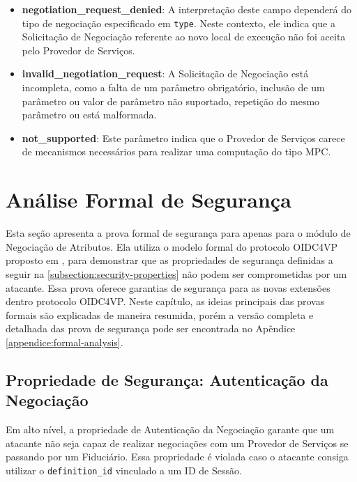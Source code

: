 \begin{itemize}
    \item \textbf{negotiation\_request\_denied}:  A interpretação deste campo dependerá do tipo de negociação especificado em \texttt{type}. Neste contexto, ele indica que a Solicitação de Negociação referente ao novo local de execução não foi aceita pelo Provedor de Serviços.

    \item \textbf{invalid\_negotiation\_request}: A Solicitação de Negociação está incompleta, como a falta de um parâmetro obrigatório, inclusão de um parâmetro ou valor de parâmetro não suportado, repetição do mesmo parâmetro ou está malformada.

    \item \textbf{not\_supported}: Este parâmetro indica que o Provedor de Serviços carece de mecanismos necessários para realizar uma computação do tipo \acs{MPC}.
    
\end{itemize}




\section{Análise Formal de Segurança}\label{section:formal-security-analysis}

Esta seção apresenta a prova formal de segurança para apenas para o módulo de Negociação de Atributos. Ela utiliza o modelo formal do protocolo \acs{OIDC4VP} proposto em , para demonstrar que as propriedades de segurança definidas a seguir na \autoref{subsection:security-properties} não podem ser comprometidas por um atacante. Essa prova oferece garantias de segurança para as novas extensões dentro protocolo \acs{OIDC4VP}. Neste capítulo, as ideias principais das provas formais são explicadas de maneira resumida, porém a versão completa e detalhada das prova de segurança pode ser encontrada no Apêndice \ref{appendice:formal-analysis}.

\subsection{Propriedade de Segurança: Autenticação da Negociação}\label{subsection:security-properties}

Em alto nível, a propriedade de Autenticação da Negociação garante que um atacante não seja capaz de realizar negociações com um Provedor de Serviços se passando por um Fiduciário. Essa propriedade é violada caso o atacante consiga utilizar o \texttt{definition\_id} vinculado a um ID de Sessão.

